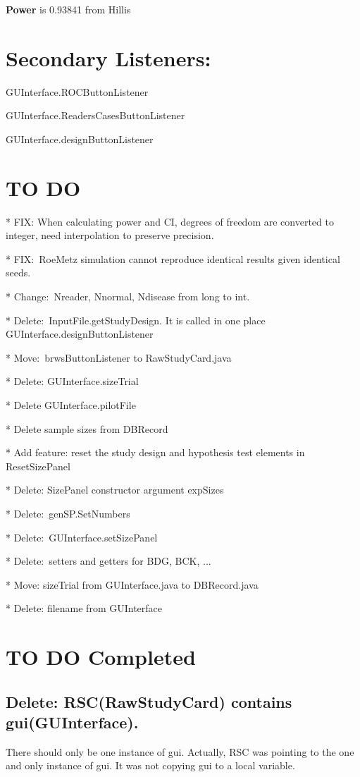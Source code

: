 \documentclass{article}%
\begin{document}
\textbf{Power} is 0.93841 from Hillis

\section{Secondary Listeners:}

GUInterface.ROCButtonListener

GUInterface.ReadersCasesButtonListener

GUInterface.designButtonListener

\section{TO DO}

* FIX: When calculating power and CI, degrees of freedom are converted to
integer, need interpolation to preserve precision.

* FIX:\ RoeMetz simulation cannot reproduce identical results given identical seeds.

* Change:\ Nreader, Nnormal, Ndisease from long to int.

* Delete:\ InputFile.getStudyDesign. It is called in one place GUInterface.designButtonListener

* Move:\ brwsButtonListener to RawStudyCard.java

* Delete: GUInterface.sizeTrial

* Delete GUInterface.pilotFile

* Delete sample sizes from DBRecord

* Add feature: reset the study design and hypothesis test elements in ResetSizePanel

* Delete: SizePanel constructor argument expSizes

* Delete:\ genSP.SetNumbers

* Delete:\ GUInterface.setSizePanel

* Delete:\ setters and getters for BDG, BCK, ...

* Move: sizeTrial from GUInterface.java to DBRecord.java

* Delete: filename from GUInterface

\section{TO DO Completed}

\subsection{Delete: RSC(RawStudyCard) contains gui(GUInterface).}

There should only be one instance of gui. Actually, RSC was pointing to the
one and only instance of gui. It was not copying gui to a local variable.
\end{document}
